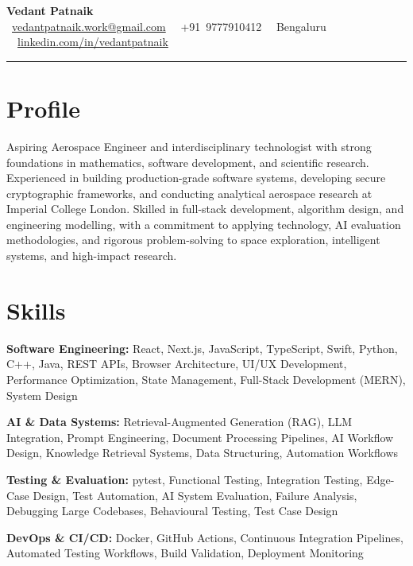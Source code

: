 \documentclass[a4paper,10pt]{article}
\begin{document}
\begin{center}
    {\Huge \textbf{Vedant Patnaik}}\\[3pt]
    \faEnvelope~\href{mailto:vedantpatnaik.work@gmail.com}{vedantpatnaik.work@gmail.com}
    \textbar~\faPhone~+91~9777910412
    \textbar~\faMapMarker~Bengaluru
    \textbar~\faLinkedinSquare~\href{https://www.linkedin.com/in/vedantpatnaik/}{linkedin.com/in/vedantpatnaik}
\end{center}
\hrule
\vspace{1em}

\section*{\color{accent} Profile}
Aspiring Aerospace Engineer and interdisciplinary technologist with strong foundations in mathematics, software development, and scientific research. Experienced in building production-grade software systems, developing secure cryptographic frameworks, and conducting analytical aerospace research at Imperial College London. Skilled in full-stack development, algorithm design, and engineering modelling, with a commitment to applying technology, AI evaluation methodologies, and rigorous problem-solving to space exploration, intelligent systems, and high-impact research.

\section*{\color{accent} Skills}

\textbf{Software Engineering:} React, Next.js, JavaScript, TypeScript, Swift, Python, C++, Java, REST APIs, Browser Architecture, UI/UX Development, Performance Optimization, State Management, Full-Stack Development (MERN), System Design

\textbf{AI \& Data Systems:} Retrieval-Augmented Generation (RAG), LLM Integration, Prompt Engineering, Document Processing Pipelines, AI Workflow Design, Knowledge Retrieval Systems, Data Structuring, Automation Workflows

\textbf{Testing \& Evaluation:} pytest, Functional Testing, Integration Testing, Edge-Case Design, Test Automation, AI System Evaluation, Failure Analysis, Debugging Large Codebases, Behavioural Testing, Test Case Design

\textbf{DevOps \& CI/CD:} Docker, GitHub Actions, Continuous Integration Pipelines, Automated Testing Workflows, Build Validation, Deployment Monitoring
\end{document}
